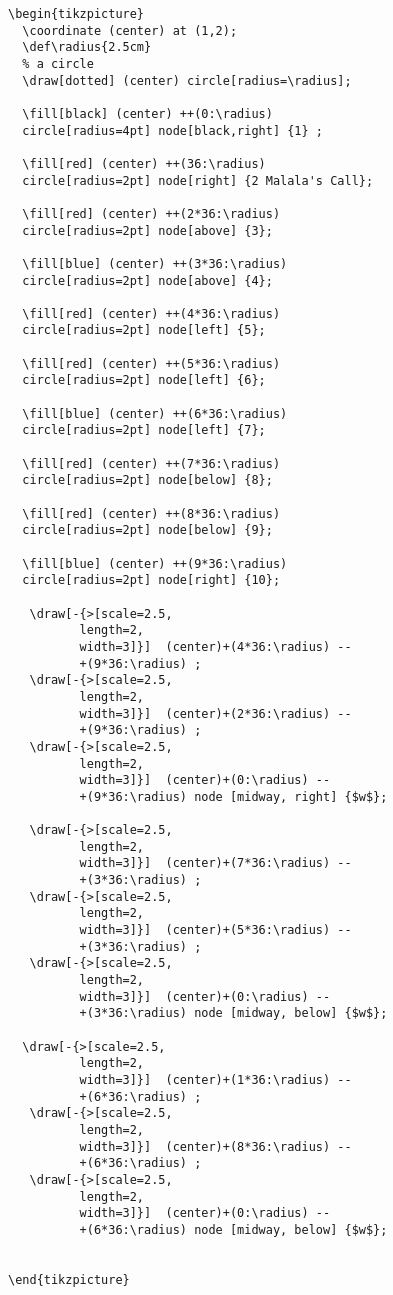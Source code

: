 \begin{verbatim}
\begin{tikzpicture}
  \coordinate (center) at (1,2);
  \def\radius{2.5cm}
  % a circle
  \draw[dotted] (center) circle[radius=\radius];

  \fill[black] (center) ++(0:\radius)
  circle[radius=4pt] node[black,right] {1} ;
  
  \fill[red] (center) ++(36:\radius)
  circle[radius=2pt] node[right] {2 Malala's Call};
  
  \fill[red] (center) ++(2*36:\radius)
  circle[radius=2pt] node[above] {3};
  
  \fill[blue] (center) ++(3*36:\radius)
  circle[radius=2pt] node[above] {4};
  
  \fill[red] (center) ++(4*36:\radius)
  circle[radius=2pt] node[left] {5};
  
  \fill[red] (center) ++(5*36:\radius)
  circle[radius=2pt] node[left] {6};
  
  \fill[blue] (center) ++(6*36:\radius)
  circle[radius=2pt] node[left] {7};
  
  \fill[red] (center) ++(7*36:\radius)
  circle[radius=2pt] node[below] {8};
  
  \fill[red] (center) ++(8*36:\radius)
  circle[radius=2pt] node[below] {9};
  
  \fill[blue] (center) ++(9*36:\radius)
  circle[radius=2pt] node[right] {10};
  
   \draw[-{>[scale=2.5,
          length=2,
          width=3]}]  (center)+(4*36:\radius) --   
          +(9*36:\radius) ;
   \draw[-{>[scale=2.5,
          length=2,
          width=3]}]  (center)+(2*36:\radius) --   
          +(9*36:\radius) ;
   \draw[-{>[scale=2.5,
          length=2,
          width=3]}]  (center)+(0:\radius) --   
          +(9*36:\radius) node [midway, right] {$w$};
 
   \draw[-{>[scale=2.5,
          length=2,
          width=3]}]  (center)+(7*36:\radius) --   
          +(3*36:\radius) ;
   \draw[-{>[scale=2.5,
          length=2,
          width=3]}]  (center)+(5*36:\radius) --   
          +(3*36:\radius) ;
   \draw[-{>[scale=2.5,
          length=2,
          width=3]}]  (center)+(0:\radius) --   
          +(3*36:\radius) node [midway, below] {$w$};
          
  \draw[-{>[scale=2.5,
          length=2,
          width=3]}]  (center)+(1*36:\radius) --   
          +(6*36:\radius) ;
   \draw[-{>[scale=2.5,
          length=2,
          width=3]}]  (center)+(8*36:\radius) --   
          +(6*36:\radius) ;
   \draw[-{>[scale=2.5,
          length=2,
          width=3]}]  (center)+(0:\radius) --   
          +(6*36:\radius) node [midway, below] {$w$};  
 
                 
\end{tikzpicture}
\end{verbatim}


